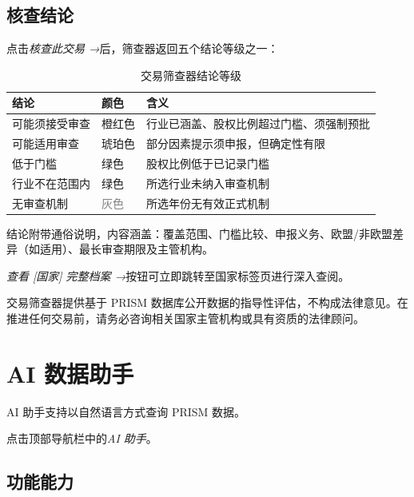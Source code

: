 \documentclass[12pt,a4paper]{article}
\newcommand{\uielem}[1]{\textit{#1}}
\begin{document}
\subsection{核查结论}

点击\uielem{核查此交易 →}后，筛查器返回五个结论等级之一：

\begin{table}[h]
\centering
\begin{tabularx}{\linewidth}{llX}
\toprule
\textbf{结论} & \textbf{颜色} & \textbf{含义} \\
\midrule
可能须接受审查 & \textcolor{prismclay}{橙红色} & 行业已涵盖、股权比例超过门槛、须强制预批 \\
可能适用审查 & \textcolor{prismamber}{琥珀色} & 部分因素提示须申报，但确定性有限 \\
低于门槛 & \textcolor{prismgreen}{绿色} & 股权比例低于已记录门槛 \\
行业不在范围内 & \textcolor{prismgreen}{绿色} & 所选行业未纳入审查机制 \\
无审查机制 & \textcolor{gray}{灰色} & 所选年份无有效正式机制 \\
\bottomrule
\end{tabularx}
\caption{交易筛查器结论等级}
\end{table}

结论附带通俗说明，内容涵盖：覆盖范围、门槛比较、申报义务、欧盟/非欧盟差异（如适用）、最长审查期限及主管机构。

\uielem{查看 [国家] 完整档案 →}按钮可立即跳转至国家标签页进行深入查阅。

\begin{warnbox}[法律免责声明]
交易筛查器提供基于 PRISM 数据库公开数据的指导性评估，不构成法律意见。在推进任何交易前，请务必咨询相关国家主管机构或具有资质的法律顾问。
\end{warnbox}

\section{AI 数据助手}
\label{sec:ai}

AI 助手支持以自然语言方式查询 PRISM 数据。

\begin{tipbox}[打开方式]
点击顶部导航栏中的\uielem{AI 助手}。
\end{tipbox}

\subsection{功能能力}
\end{document}
